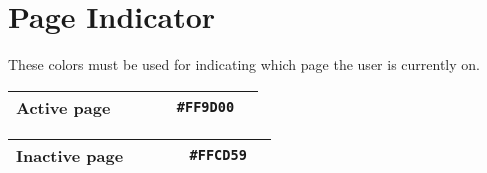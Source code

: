 \section{Page Indicator}
These colors must be used for indicating which page the user is currently on.

\begin{table}[!htbp]
	\begin{tabularx}{\textwidth}{X r c r c}
		Active page
		& ~ & ~
		& \texttt{\#FF9D00} & \cellcolor[HTML]{FF9D00}\phantom{--} \\ \hline
	\end{tabularx}
\end{table}

\begin{table}[!htbp]
	\begin{tabularx}{\textwidth}{X r c r c}
		Inactive page 
		& ~ & ~
		& \texttt{\#FFCD59} & \cellcolor[HTML]{FFCD59}\phantom{--} \\ \hline
	\end{tabularx}
\end{table}